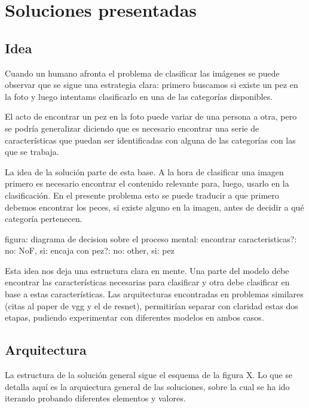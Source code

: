 
\chapter{Soluciones presentadas} %

\label{ChapterX} %

\section{Idea}
Cuando un humano afronta el problema de clasificar las imágenes se puede
observar que se sigue una estrategia clara: primero buscamos si
existe un pez en la foto y luego intentams clasificarlo en una de las categorías
disponibles. 

El acto de encontrar un pez en la foto puede variar de una persona a otra,
pero se podría generalizar diciendo que es necesario encontrar una serie de
características que puedan ser identificadas con alguna de las categorías con
las que se trabaja.

La idea de la solución parte de esta base. A la hora de clasificar una
imagen primero es necesario encontrar el contenido relevante para, luego, 
usarlo en la clasificación. En el presente problema esto se puede traducir a que
primero debemos encontrar los peces, si existe alguno en la imagen, antes de
decidir a qué categoría pertenecen.

figura: diagrama de decision sobre el proceso mental:
encontrar caracteristicas?: no: NoF, si: encaja con pez?: no: other, si: pez

Esta idea nos deja una estructura clara en mente. Una parte del modelo debe
encontrar las características necesarias para clasificar y otra debe clasificar
en base a estas características. Las arquitecturas encontradas en problemas
similares (citas al paper de vgg y el de resnet), permitirían separar con 
claridad estas dos etapas, pudiendo experimentar con diferentes modelos en ambos
casos.

\section{Arquitectura}
La estructura de la solución general sigue el esquema de la figura X. Lo que se
detalla aquí es la arquiectura general de las soluciones, sobre la cual se ha
ido iterando probando diferentes elementos y valores.

